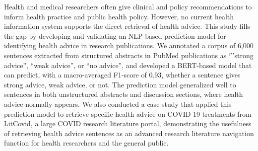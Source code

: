 Health and medical researchers often give clinical and policy recommendations to inform health practice and public health policy.  However, no current health information system supports the direct retrieval of health advice. This study fills the gap by developing and validating an NLP-based prediction model for identifying health advice in research publications. We annotated a corpus of 6,000 sentences extracted from structured abstracts in PubMed publications as `''strong advice'', ``weak advice'', or ``no advice'', and developed a BERT-based model that can predict, with a macro-averaged F1-score of 0.93, whether a sentence gives strong advice, weak advice, or not. The prediction model generalized well to sentences in both unstructured abstracts and discussion sections, where health advice normally appears. We also conducted a case study that applied this prediction model to retrieve specific health advice on COVID-19 treatments from LitCovid, a large COVID research literature portal, demonstrating the usefulness of retrieving health advice sentences as an advanced research literature navigation function for health researchers and the general public.
